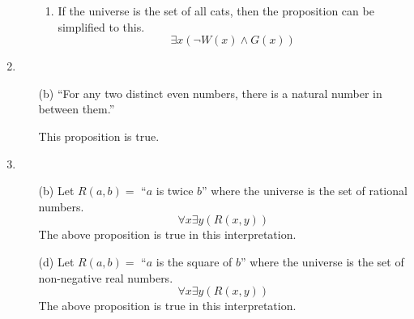 \documentclass[fleqn]{article}
\begin{document}
\begin{enumerate}
\begin{enumerate}
\begin{enumerate}
			\item %
			If the universe is the set of all cats, then the proposition can be simplified to this.
			\[\exists x (\lnot W(x) \land G(x))\]
		\end{enumerate}
	\end{enumerate}
	
	\item %
	\begin{enumerate}
		\item[(b)]
		``For any two distinct even numbers, there is a natural number in between them.''

		This proposition is true.
	\end{enumerate}
	
	\item %
	\begin{enumerate}
		\item[(b)]
		Let \(R(a, b) = \) ``\(a\) is twice \(b\)'' where the universe is the set of rational numbers.
		\[\forall x \exists y (R(x, y))\]
		The above proposition is true in this interpretation.
		
		\item[(d)]
		Let \(R(a, b) = \) ``\(a\) is the square of \(b\)'' where the universe is the set of non-negative real numbers.
		\[\forall x \exists y (R(x, y))\]
		The above proposition is true in this interpretation.
	\end{enumerate}
	
	

\end{enumerate}
    
\end{document}
